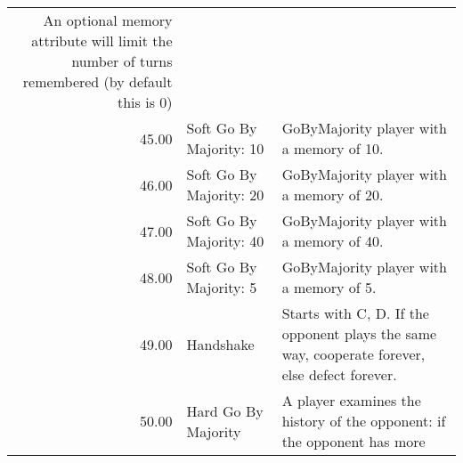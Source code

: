 \begin{table}[!hbtp]
\begin{adjustbox}{width=2\textwidth, angle=90}
\begin{tabular}{rll}
	An optional memory attribute will limit the number of turns remembered (by
	default this is 0)                                                                                                                                                                                                                                                                                                                                                                                                                                                                                                                                               \\
	45.00  & Soft Go By Majority: 10     & GoByMajority player with a memory of 10.                                                                                          \\
	46.00  & Soft Go By Majority: 20     & GoByMajority player with a memory of 20.                                                                                          \\
	47.00  & Soft Go By Majority: 40     & GoByMajority player with a memory of 40.                                                                                          \\
	48.00  & Soft Go By Majority: 5      & GoByMajority player with a memory of 5.                                                                                           \\
	49.00  & Handshake                   & Starts with C, D. If the opponent plays the same way, cooperate forever,
	else defect forever.                                                                                                                                                                                                                                                                                                                                                                                                                                                                                                                                                                                                                                                                                                                                                                                                                                                                                                                        \\
	50.00  & Hard Go By Majority         & A player examines the history of the opponent: if the opponent has more \\

\end{tabular}
\end{adjustbox}
\end{table}
